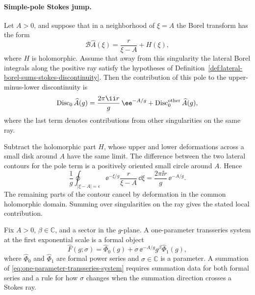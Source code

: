 \paragraph{Simple-pole Stokes jump.}
Let \(A>0\), and suppose that in a neighborhood of \(\xi=A\) the Borel
transform has the form
\begin{equation}
  \mathcal B\widehat A(\xi)
  =
  \frac{r}{\xi-A}+H(\xi),
  \label{eq:simple-borel-pole-local-form}
\end{equation}
where \(H\) is holomorphic.  Assume that away from this singularity the
lateral Borel integrals along the positive ray satisfy the hypotheses of
Definition~\ref{def:lateral-borel-sums-stokes-discontinuity}.  Then the
contribution of this pole to the upper-minus-lower discontinuity is
\begin{equation}
  \operatorname{Disc}_{0}\widehat A(g)
  =
  \frac{2\pi\ii r}{g}\,\ee^{-A/g}
  +
  \operatorname{Disc}_{0}^{\rm other}\widehat A(g),
  \label{eq:simple-pole-stokes-jump}
\end{equation}
where the last term denotes contributions from other singularities on the
same ray.

Subtract the holomorphic part \(H\), whose upper and lower deformations across
a small disk around \(A\) have the same limit.  The difference between the
two lateral contours for the pole term is a positively oriented small circle
around \(A\).  Hence
\[
  \frac1g\oint_{|\xi-A|=\epsilon}
  \ee^{-\xi/g}\frac{r}{\xi-A}\,\dd\xi
  =
  \frac{2\pi\ii r}{g}\,\ee^{-A/g}.
\]
The remaining parts of the contour cancel by deformation in the common
holomorphic domain.  Summing over singularities on the ray gives the stated
local contribution.

\begin{definition}
\label{def:one-parameter-transseries-system}
Fix \(A>0\), \(\beta\in\mathbb C\), and a sector in the \(g\)-plane.  A
one-parameter transseries system at the first exponential scale is a formal
object
\begin{equation}
  \widehat F(g;\sigma)
  =
  \widehat\Phi_0(g)
  +
  \sigma\,\ee^{-A/g}g^\beta\widehat\Phi_1(g),
  \label{eq:one-parameter-transseries-system}
\end{equation}
where \(\widehat\Phi_0\) and \(\widehat\Phi_1\) are formal power series and
\(\sigma\in\mathbb C\) is a parameter.  A summation of
\eqref{eq:one-parameter-transseries-system} requires summation data for both
formal series and a rule for how \(\sigma\) changes when the summation
direction crosses a Stokes ray.
\end{definition}

